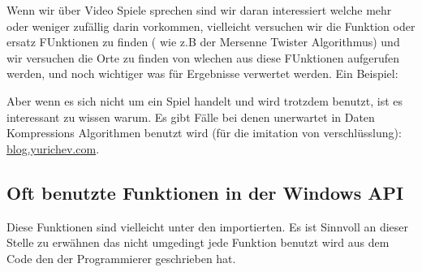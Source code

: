 

Wenn wir über Video Spiele sprechen sind wir daran interessiert welche mehr oder weniger zufällig darin vorkommen,
vielleicht versuchen wir die \rand Funktion oder ersatz FUnktionen zu finden ( wie z.B der Mersenne Twister Algorithmus) 
und wir versuchen die Orte zu finden von wlechen aus diese FUnktionen aufgerufen werden, und noch wichtiger was für
Ergebnisse verwertet werden. 
Ein Beispiel:



Aber wenn es sich nicht um ein Spiel handelt und \rand wird trotzdem benutzt, ist es interessant zu wissen warum.
Es gibt Fälle bei denen unerwartet \rand in Daten Kompressions Algorithmen benutzt wird (für die imitation von verschlüsslung):
\href{http://go.yurichev.com/17221}{blog.yurichev.com}.


\subsection{Oft benutzte Funktionen in der Windows API}

Diese Funktionen sind vielleicht unter den importierten.
Es ist Sinnvoll an dieser Stelle zu erwähnen das nicht umgedingt jede Funktion benutzt wird aus 
dem Code den der Programmierer geschrieben hat.

